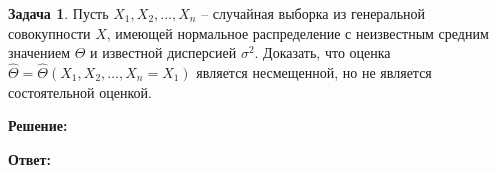 \documentclass[a4paper,12pt]{article}
\theoremstyle{definition}
\newtheorem{problem}{Задача}\setlength{\parindent}{0pt}
\newenvironment{solution}
{\begin{shaded}\textbf{Решение:}\par\setlength{\parindent}{0pt}}
{\end{shaded}}
\newenvironment{answer}
{\par\noindent\textbf{Ответ:} \color{blue}}
{\par}
\begin{document}
\begin{problem}
    Пусть \(X_1,X_2, ... ,X_n\) – случайная выборка из генеральной совокупности \(X\), 
    имеющей нормальное распределение с неизвестным средним значением \( \Theta \) 
    и известной дисперсией \( \sigma ^ 2\). Доказать, что оценка 
    \( \hat\Theta = \hat\Theta (X_1,X_2, ... ,X_n = X_1) \) является несмещенной, 
    но не является состоятельной оценкой.

    \begin{solution}
    \end{solution}

    \begin{answer}
    \end{answer}

\end{problem}
\end{document}

